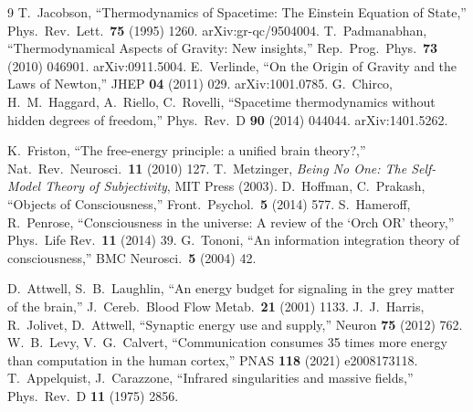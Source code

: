 \documentclass[12pt,a4paper,twoside]{article}
\theoremstyle{plain}
\theoremstyle{definition}
\theoremstyle{remark}
\begin{document}
\begin{thebibliography}{9}
T.~Jacobson, ``Thermodynamics of Spacetime: The Einstein Equation of State,'' Phys.\ Rev.\ Lett.\ \textbf{75} (1995) 1260. arXiv:gr-qc/9504004.
T.~Padmanabhan, ``Thermodynamical Aspects of Gravity: New insights,'' Rep.\ Prog.\ Phys.\ \textbf{73} (2010) 046901. arXiv:0911.5004.
E.~Verlinde, ``On the Origin of Gravity and the Laws of Newton,'' JHEP \textbf{04} (2011) 029. arXiv:1001.0785.
G.~Chirco, H.~M.~Haggard, A.~Riello, C.~Rovelli, ``Spacetime thermodynamics without hidden degrees of freedom,'' Phys.\ Rev.\ D \textbf{90} (2014) 044044. arXiv:1401.5262.

K.~Friston, ``The free-energy principle: a unified brain theory?,'' Nat.\ Rev.\ Neurosci.\ \textbf{11} (2010) 127.
T.~Metzinger, \textit{Being No One: The Self-Model Theory of Subjectivity}, MIT Press (2003).
D.~Hoffman, C.~Prakash, ``Objects of Consciousness,'' Front.\ Psychol.\ \textbf{5} (2014) 577.
S.~Hameroff, R.~Penrose, ``Consciousness in the universe: A review of the `Orch OR' theory,'' Phys.\ Life Rev.\ \textbf{11} (2014) 39.
G.~Tononi, ``An information integration theory of consciousness,'' BMC Neurosci.\ \textbf{5} (2004) 42.

D.~Attwell, S.~B.~Laughlin, ``An energy budget for signaling in the grey matter of the brain,'' J.\ Cereb.\ Blood Flow Metab.\ \textbf{21} (2001) 1133.
J.~J.~Harris, R.~Jolivet, D.~Attwell, ``Synaptic energy use and supply,'' Neuron \textbf{75} (2012) 762.
W.~B.~Levy, V.~G.~Calvert, ``Communication consumes 35 times more energy than computation in the human cortex,'' PNAS \textbf{118} (2021) e2008173118.
T.~Appelquist, J.~Carazzone, ``Infrared singularities and massive fields,'' Phys.\ Rev.\ D \textbf{11} (1975) 2856.


\end{thebibliography}
\end{document}
